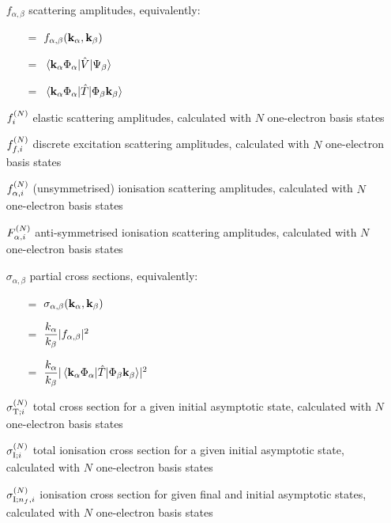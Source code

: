 \documentclass[]{article}
\begin{document}
\begin{itemize}
\item[$f_{\alpha, \beta}$]
  scattering amplitudes, equivalently:
  \begin{itemize}
  \item[$=$]
    $f_{\alpha, \beta}(\vb{k}_{\alpha}, \vb{k}_{\beta})$
  \item[$=$]
    $\mel*{\vb{k}_{\alpha}\Phi_{\alpha}}{\hat{V}}{\Psi_{\beta}}$
  \item[$=$]
    $\mel*{\vb{k}_{\alpha}\Phi_{\alpha}}{\hat{T}}{\Phi_{\beta}\vb{k}_{\beta}}$
  \end{itemize}
\item[$f_{i}^{(N)}$]
  elastic scattering amplitudes, calculated with $N$ one-electron basis states
\item[$f_{f, i}^{(N)}$]
  discrete excitation scattering amplitudes, calculated with $N$ one-electron
  basis states
\item[$f_{\alpha, i}^{(N)}$]
  (unsymmetrised) ionisation scattering amplitudes, calculated with $N$
  one-electron basis states
\item[$F_{\alpha, i}^{(N)}$]
  anti-symmetrised ionisation scattering amplitudes, calculated with $N$
  one-electron basis states
\item[$\sigma_{\alpha, \beta}$]
  partial cross sections, equivalently:
  \begin{itemize}
  \item[$=$]
    $\sigma_{\alpha, \beta}(\vb{k}_{\alpha}, \vb{k}_{\beta})$
  \item[$=$]
    $\dfrac{k_{\alpha}}{k_{\beta}}\lvert f_{\alpha, \beta}\rvert^{2}$
  \item[$=$]
    $
    \dfrac{k_{\alpha}}{k_{\beta}}
    \lvert
      \mel*
      {\vb{k}_{\alpha} \Phi_{\alpha}}
      {\hat{T}}
      {\Phi_{\beta} \vb{k}_{\beta}}
    \rvert^{2}
    $
  \end{itemize}

\item[$\sigma_{\mathrm{T}; i}^{(N)}$]
  total cross section for a given initial asymptotic state, calculated with $N$
  one-electron basis states
\item[$\sigma_{\mathrm{I}; i}^{(N)}$]
  total ionisation cross section for a given initial asymptotic state,
  calculated with $N$ one-electron basis states
\item[$\sigma_{\mathrm{I}; n_{f}, i}^{(N)}$]
  ionisation cross section for given final and initial asymptotic states,
  calculated with $N$ one-electron basis states
\end{itemize}
\end{document}

